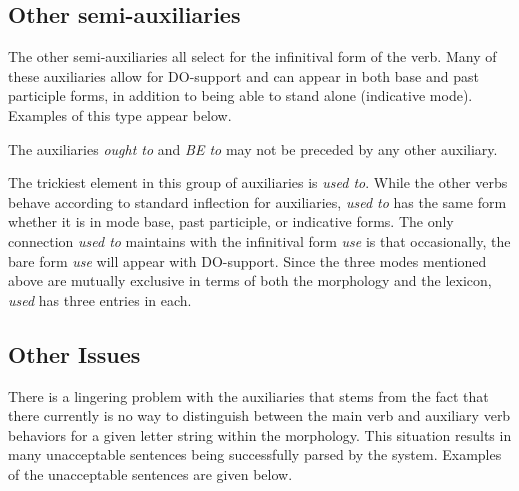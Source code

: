 \subsection{Other semi-auxiliaries}

The other semi-auxiliaries all select for the infinitival form of the verb.
Many of these auxiliaries allow for DO-support and can appear in both base and
past participle forms, in addition to being able to stand alone (indicative 
mode).  Examples of this type appear below.


The auxiliaries {\it ought to} and {\it BE to} may not be preceded by any other
auxiliary.  


The trickiest element in this group of auxiliaries is {\it used to}.  While the
other verbs behave according to standard inflection for auxiliaries, {\it used
to} has the same form whether it is in mode base, past participle, or
indicative forms.  The only connection {\it used to} maintains with the
infinitival form {\it use} is that occasionally, the bare form {\it use} will
appear with DO-support.  Since the three modes mentioned above are mutually
exclusive in terms of both the morphology and the lexicon, {\it used} has three
entries in each.  

\subsection{Other Issues}

There is a lingering problem with the auxiliaries that stems from the fact that
there currently is no way to distinguish between the main verb and auxiliary verb
behaviors for a given letter string within the morphology.  This situation
results in many unacceptable sentences being successfully parsed by the system.
Examples of the unacceptable sentences are given below.





        




